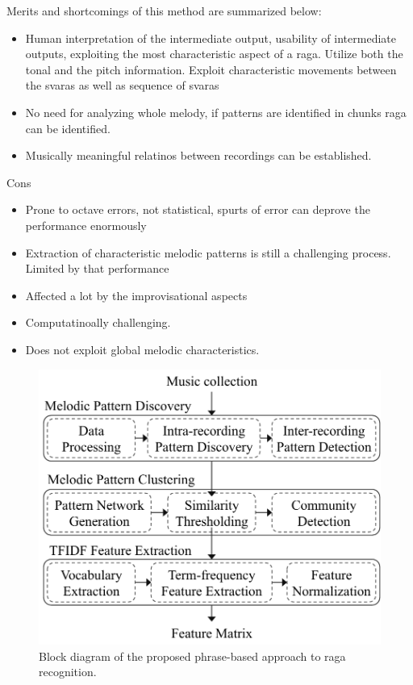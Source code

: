 Merits and shortcomings of this method are summarized below:
\begin{itemize}
	\item Human interpretation of the intermediate output, usability of intermediate outputs, exploiting the most characteristic aspect of a raga. Utilize both the tonal and the pitch information. Exploit characteristic movements between the svaras as well as sequence of svaras
	\item No need for analyzing whole melody, if patterns are identified in chunks raga can be identified.
	\item Musically meaningful relatinos between recordings can be established.
\end{itemize}

Cons
\begin{itemize}
	\item Prone to octave errors, not statistical, spurts of error can deprove the performance enormously
	\item Extraction of characteristic melodic patterns is still a challenging process. Limited by that performance
	\item Affected a lot by the improvisational aspects
	\item Computatinoally challenging. 
	\item Does not exploit global melodic characteristics.
\end{itemize}


\begin{figure}
	\begin{center}
		\includegraphics[width=\figSizeSeventy]{ch07_ragaRecognition/figures/bd_phasebased_raga_recognition.pdf}
	\end{center}
	\caption{Block diagram of the proposed phrase-based approach to \gls{raga} recognition.}
	\label{fig:bd_phasebased_raga_recognition}
\end{figure}





